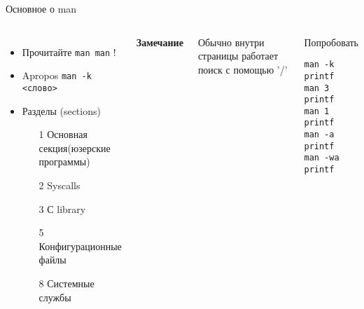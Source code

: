 \begin{frame}[fragile]{Основное о man}
\begin{columns}
	\column{2.2in}
		\begin{itemize}
			\item Прочитайте {\tt man man} !
			\item Apropos {\tt man -k <слово>}
			\item Разделы (sections)
				\begin{itemize}
					\item[1] Основная секция(юзерские программы)
					\item[2] Syscalls
					\item[3] С library
					\item[5] Конфигурационные файлы
					\item[8] Системные службы
				\end{itemize}
		\end{itemize}
	  \textbf{Замечание}

	  Обычно внутри страницы работает поиск с помощью '/'
	\pause 
	
	\column{1in}
		\begin{block}{Попробовать}
			\begin{lstlisting}
man -k printf
man 3 printf
man 1 printf
man -a printf
man -wa printf
			\end{lstlisting}
		\end{block}
	\end{columns}
\end{frame}


